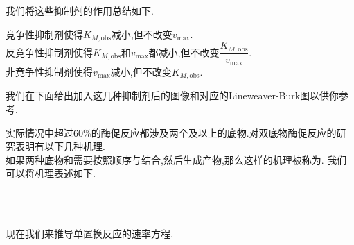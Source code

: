 \documentclass{ctexart}
\begin{document}
我们将这些抑制剂的作用总结如下.
\begin{theorem}[7D.3.5 抑制剂的作用]
    竞争性抑制剂使得$K_{M,\text{obs}}$减小,但不改变$v_{\max}$.\\
    反竞争性抑制剂使得$K_{M,\text{obs}}$和$v_{\max}$都减小,但不改变$\dfrac{K_{M,\text{obs}}}{v_{\max}}$.\\
    非竞争性抑制剂使得$v_{\max}$减小,但不改变$K_{M,\text{obs}}$.
\end{theorem}
我们在下面给出加入这几种抑制剂后的图像和对应的Lineweaver-Burk图以供你参考.
\begin{figure}[H]
    \centering
\end{figure}
\begin{figure}[H]
    \centering
\end{figure}
\indent 实际情况中超过60\%的酶促反应都涉及两个及以上的底物.对双底物酶促反应的研究表明有以下几种机理.\\
\indent 如果两种底物和需要按照顺序与结合,然后生成产物,那么这样的机理被称为.%
我们可以将机理表述如下.
\begin{tightcenter}
    \\
    \\
\end{tightcenter}
现在我们来推导单置换反应的速率方程.
\end{document}

